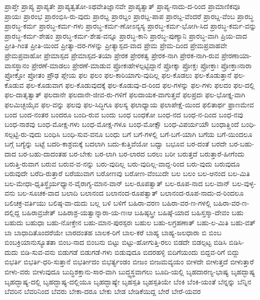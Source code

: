 {ಪ್ರಾಪ್ತೇ
ಪ್ರಾಪ್ಯ
ಪ್ರಾಪ್ಯತೇ
ಪ್ರಾಪ್ಯತ್ವತೋ-ಽಥವೇತಿಜ್ಞಾನವೇ
ಪ್ರಾಪ್ಯತ್ವಾತ್
ಪ್ರಾಪ್ಯ-ನಾದು-ದ-ರಿಂದ
ಪ್ರಾಮಾಣಿಕವೂ
ಪ್ರಾಯಃ
ಪ್ರಾರಂಭ
ಪ್ರಾರಂಭಿಸಿ-ರು-ವುದು
ಪ್ರಾರಬ್ದ
ಪ್ರಾರಬ್ದಂ
ಪ್ರಾರಬ್ದ-ಪಾಪ
ಪ್ರಾರಬ್ದ-ವೆಂದರೆ
ಪ್ರಾರಬ್ದ-ವೆಂಬ
ಪ್ರಾರಬ್ಧ
ಪ್ರಾರಬ್ಧ-ಕರ್ಮ
ಪ್ರಾರಬ್ಧ-ಕರ್ಮ-ಗಳು
ಪ್ರಾರಬ್ಧ-ಕರ್ಮ-ಣೋಽನ್ಯಸ್ಯ
ಪ್ರಾರಬ್ಧ-ಕರ್ಮ-ಭೋಗಿ-ಸಿದ
ಪ್ರಾರಬ್ಧ-ಕರ್ಮ-ವನ್ನು
ಪ್ರಾರಬ್ಧ-ಕರ್ಮ-ಶೇಷಂ
ಪ್ರಾರಬ್ಧ-ಕರ್ಮ-ಶೇಷ-ವನ್ನೂ
ಪ್ರಾರಬ್ಧ-ಕಾನಿ
ಪ್ರಾರಬ್ಧ-ಪುಣ್ಯಾನಿ
ಪ್ರಾರಬ್ಧ-ವಾಗಿ
ಪ್ರಿಯ-ವಾದ
ಪ್ರೀತಿ-ಗಿಂತ
ಪ್ರೀತಿ-ಯಿಂದ
ಪ್ರೀತ್ಯಾ-ದರ-ಗಳನ್ನು
ಪ್ರೀತ್ಯಾಸ್ಪದ-ವಾದ
ಪ್ರೇಮ
ಪ್ರೇಮ-ದಿಂದ
ಪ್ರೇಮಪ್ರವಾಹವೇ
ಪ್ರೇಮಪ್ರವಾಹೋ
ಪ್ರೇಮಾಸ್ಪದ
ಪ್ರೇಮಾಸ್ಪದ-ತಯಾ
ಪ್ರೇರಕ
ಪ್ರೇರಕತ್ವ
ಪ್ರೇರಕ-ನಾಗಿ
ಪ್ರೇರಕ-ನಾಗಿ-ರುವ
ಪ್ರೇರಣಾಯಾ-ವಾಸಸ್ಥಾನಂ
ಪ್ರೇರಣೆ-ಮಾಡಲು
ಪ್ರೇರಣೆ-ಮಾಡುವ
ಪ್ರೋಕಃಹೇಳಲ್ಪಟ್ಟಿದ್ದಾನೆ
ಪ್ರೋಕ್ಕಾ
ಪ್ರೋಕ್ತಃ
ಪ್ರೋಕ್ತಾಃ
ಪ್ರೋಕ್ತಾಃನಾರಾ
ಪ್ರೋಕ್ತೋ
ಪ್ರೋತಂ
ಪ್ರೌಢ
ಪ್ಲೇಯ
ಫಲ
ಫಲಂ
ಫಲ-ಕಾರಿಯಾಗು-ವುದಿಲ್ಲ
ಫಲ-ಕೊಡಲು
ಫಲ-ಕೊಡುತ್ತಾನೆ
ಫಲ-ಕೊಡುವ
ಫಲ-ಕೊಡುವಾಗ
ಫಲ-ಕೊಡುವುದಕ್ಕೆ
ಫಲ-ಕೊಡುವು-ದ-ರಿಂದ
ಫಲ-ಗಳನ್ನು
ಫಲ-ಗಳು
ಫಲದಂ
ಫಲ-ದಲ್ಲಿ
ಫಲ-ದಾತೃತ್ವಾತ್
ಫಲದಾನೇ
ಫಲದಾನೇ-ಜೀವ-ರು-ಗಳಿಗೆ
ಫಲದಾಯಕ-ವಾಗುತ್ತವೆ
ಫಲಪ್ರದಃ
ಫಲ-ಭೋಕ್ತೃ-ವಾಗಿ
ಫಲಮಿಚ್ಛಯೈವ
ಫಲ-ವನ್ನು
ಫಲವು
ಫಲ-ಸಿದ್ಧಿಗೂ
ಫಲಸ್ಯ
ಫಲಾಧ್ಯಾಯ
ಫಲಾಪೇಕ್ಷೆ-ಯಿಂದ
ಫಲಿತಾರ್ಥ
ಫ್ರಾಣಮೇವ
ಬಂದ
ಬಂದ-ನಂತರ
ಬಂದರೂ
ಬಂದಿ-ರುವ
ಬಂದು
ಬಂಧ
ಬಂಧಕೋ
ಬಂಧ-ನದ
ಬಂಧ-ನ-ದಿಂದ
ಬಂಧ-ನವು
ಬಂಧ-ನಾಶವು
ಬಂಧ-ಮೋಕ್ಷ-ಗಳು
ಬಂಧ-ಮೋಕ್ಷ-ಗಳೂ
ಬಂಧ-ಮೋಕ್ಷೌ
ಬಂಧ-ವಿಪರ್ಯಯೌ
ಬಂಧಾತ್ಹಿಂದೆ
ಬಂಧಿ-ಸಲ್ಪಟ್ಟಿ-ರು-ವುದು
ಬಂಧಿಸಿ
ಬಂಧಿ-ಸುವ-ವನೂ
ಬಂಧು
ಬಗೆ
ಬಗೆ-ಗಳಲ್ಲಿ
ಬಗೆ-ಬಗೆ-ಯಾಗಿ
ಬಗೆಯ
ಬಗೆ-ಯಿಂದಲೂ
ಬಗ್ಗೆ
ಬಗ್ಯೆನ್ನು
ಬಟ್ಟೆ
ಬದರಿ-ಕಾಶ್ರಮಕ್ಕೆ
ಬದಲಾಗಿ
ಬದು-ಕುತ್ತಿವೆಯೋ
ಬಧ್ವಾ
ಬಭೂವ
ಬರ-ದಂತೆ
ಬರದೇ
ಬರ-ಬಹು-ದಾದ
ಬರ-ಬಹು-ದಾದಂತಹ
ಬರ-ಬೇಕು
ಬರ-ಲಾಗಿ
ಬರ-ಲಾರದ
ಬರಲು
ಬರೀ
ಬರುತ್ತದೆ
ಬರುತ್ತಾರೆ-ಹೀಗೆಂದು
ಬರುತ್ತಿ-ರುವಾಗ
ಬರುವ
ಬರುವ-ವ-ನನ್ನು
ಬರು-ವುದಿಲ್ಲ
ಬರು-ವುದಿಲ್ಲ-ವಾದ್ದ-ರಿಂದ
ಬರು-ವುದು
ಬರುವುದೂ
ಬರುವುದೇ
ಬರೆದಿ-ರುತ್ತಾರೆ
ಬರೆಯುವಾಗ
ಬರೋಣವು
ಬರೋಣ-ವೆಂಬುದೇ
ಬಲ
ಬಲಂ
ಬಲ-ಆನಂದ
ಬಲ-ಮಿತಿ
ಬಲ-ಮೇಧಾ-ಧೃತಿಸ್ಥೈರ್ಯಧ್ಯಾನ-ವೈರಾಗ್ಯ-ಮಾನ-ವಾನ್
ಬಲ-ರೂಪತ್ವಾತ್
ಬಲ-ರೂಪ-ನಾದ
ಬಲ-ವಾನ್
ಬಲ-ವುಳ್ಳ-ವನು
ಬಲ-ಸೂಚಕ-ವಾದ
ಬಲಾದಿ
ಬಲಾನಂದ
ಬಲಾನಂದ-ರೂಪತ್ವಾತ್
ಬಲಾನಂದ-ರೂಪ-ನಾದು-ದ-ರಿಂದಲೂ
ಬಲಿಚಕ್ರ-ವರ್ತಿಯು
ಬಲಿಷ್ಠ-ವಾ-ದುದು
ಬಲ್ಲ
ಬಳಿ
ಬಳಿಗೆ
ಬಹಿರಾ-ವರಣ
ಬಹಿರಾ-ವರ-ಣ-ಗಳಲ್ಲಿ
ಬಹಿರಾ-ವರ-ಣ-ದಲ್ಲಿದ್ದ
ಬಹಿರಾವ್ರಜೇತ್
ಬಹಿರಾಶ್ರ-ಯತ್ವಾನ್ನಾರಾ-ಯ-ಣಃಆ
ಬಹಿಷ್ಠಸ್ತ್ರೀ
ಬಹಿಷ್ಠೆ-ಯಾದ
ಬಹಿಸ್ತಸ್ಮಾ-ದೇವಂ
ಬಹು
ಬಹುದು
ಬಹುಧಾ
ಬಹು-ನೋಕ್ತೇನ
ಬಹು-ಮಾನ-ಪುರಸ್ಪರಃ
ಬಹುಲ
ಬಹು-ಲಗ್ರಹಣಾತ್
ಬಹು-ಲ-ಮಿತಿ
ಬಹು-ವತ್
ಬಾ
ಬಾಧಾದಿತೊಂದರೆಯೇ
ಬಾರದಂತಹ
ಬಾಲಕ-ರಿಗೆ
ಬಾಲ-ಕರೆ
ಬಾಹ್ಯ
ಬಾಹ್ಯ-ಜಲಧಾರಾ
ಬಿ
ಬಿಂಬ
ಬಿಂಬಕ್ರಿಯಾನುಸ್ಯೂತತಾ
ಬಿಂಬ-ನಾದ
ಬಿಂಬನು
ಬಿಟ್ಟು
ಬಿಟ್ಟು-ಹೋಗುತ್ತಿ-ರಲು
ಬಿಡದೇ
ಬಿಡಲ್ಪಟ್ಟ
ಬಿಡಿಸಿ
ಬಿಡಿಸಿ-ದುದು
ಬಿಡಿ-ಸುವ-ವನು
ಬಿಡುಗಡೆ
ಬಿಡುಗಡೆ-ಗಳು
ಬಿಡುವುದೂ
ಬಿದರಹಳ್ಳಿ
ಬಿದಿಗೆಯಂದು
ಬಿದ್ದವ-ರಿಗೆ
ಬಿದ್ದು
ಬಿಭರ್ತಿ
ಬಿಭರ್ತಿ-ಧರಿ-ಸುತ್ತಾನೆ
ಬಿಭರ್ತೀದಂ
ಬಿಭರ್ತ್ಯಂಡಂ
ಬೀಜಂ
ಬೀಜಮವ್ಯಯಂ
ಬೀಳದೇ
ಬೀಳುತ್ತದೆ
ಬೀಳುತ್ತಾರೆ
ಬೀಳು-ವರು
ಬೀಳುವುದೂ
ಬುದ್ಧಿಶಕ್ತಾನು-ಸಾರ-ವಾಗಿ
ಬುದ್ಧ್ಯಸ್ಥವಾಗಲು
ಬೂದಿ-ಯಲ್ಲಿ
ಬೃಹದಾರಣ್ಯ-ಭಾಷ್ಯ
ಬೃಹದ್ಭಾಷ್ಯ
ಬೃಹದ್ಭಾಷ್ಯ-ದಲ್ಲಿ
ಬೃಹದ್ಭಾಷ್ಯ-ದಲ್ಲಿಯೂ
ಬೃಹದ್ಭಾಷ್ಯೇ
ಬೃಹಸ್ಪತಿ
ಬೃಹಸ್ಪತಿಯೇ
ಬೆಂಕಿ
ಬೆಂಕಿ-ಯಂತೆ
ಬೆನ್ನನ್ನು
ಬೆನ್ನಿನ
ಬೆವರಿನ
ಬೆವರಿನಿಂದ
ಬೆವರು
ಬೇಕಾ-ದರೂ
ಬೇಕು
ಬೇಡ
ಬೇಡಿಕೆಯಿದ್ದ
ಬೇರೆ
ಬೇರೆ-ಯವರ
}
